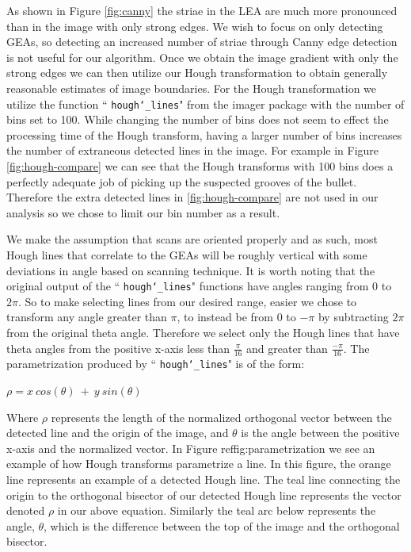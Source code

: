 \documentclass[12pt]{article}\usepackage[]{graphicx}\usepackage[]{color}
\theoremstyle{nonumberplain}
\begin{document}
As shown in Figure \ref{fig:canny} the striae in the LEA are much more pronounced than in the image with only strong edges. We wish to focus on only detecting GEAs, so detecting an increased number of striae through Canny edge detection is not useful for our algorithm. Once we obtain the image gradient with only the strong edges we can then utilize our Hough transformation to obtain generally reasonable estimates of image boundaries. For the Hough transformation we utilize the function `` \texttt{hough\char`_lines}" from the imager package with the number of bins set to 100. While changing the number of bins does not seem to effect the processing time of the Hough transform, having a larger number of bins increases the number of extraneous detected lines in the image. For example in Figure \ref{fig:hough-compare} we can see that the Hough transforms with 100 bins does a perfectly adequate job of picking up the suspected grooves of the bullet. Therefore the extra detected lines in \ref{fig:hough-compare} are not used in our analysis so we chose to limit our bin number as a result.

We make the assumption that scans are oriented properly and as such, most Hough lines that correlate to the GEAs will be roughly vertical with some deviations in angle based on scanning technique. It is worth noting that the original output of the `` \texttt{hough\char`_lines}" functions have angles ranging from 0 to $2\pi$. So to make selecting lines from our desired range, easier we chose to transform any angle greater than $\pi$, to instead be from 0 to $-\pi$ by subtracting $2\pi$ from the original theta angle. Therefore we select only the Hough lines that have theta angles from the positive x-axis less than $\frac{\pi}{16}$ and greater than $\frac{-\pi}{16}$. The parametrization produced by `` \texttt{hough\char`_lines}" is of the form:

\begin{center}
$\rho = x \ cos(\theta) \ + \ y \ sin(\theta)$
\end{center}

Where $\rho$ represents the length of the normalized orthogonal vector between the detected line and the origin of the image, and $\theta$ is the angle between the positive x-axis and the normalized vector. In Figure ref{fig:parametrization} we see an example of how Hough transforms parametrize a line. In this figure, the orange line represents an example of a detected Hough line. The teal line connecting the origin to the orthogonal bisector of our detected Hough line represents the vector denoted $\rho$ in our above equation. Similarly the teal arc below represents the angle, $\theta$, which is the difference between the top of the image and the orthogonal bisector. 
\end{document}

